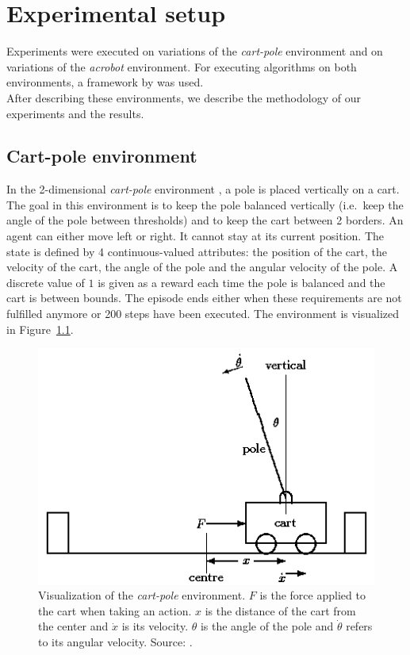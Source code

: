\chapter{Experimental setup}
Experiments were executed on variations of the \textit{cart-pole} environment and on variations of the \textit{acrobot} environment.
For executing algorithms on both environments, a framework by \cite{Brockman2016OpenAIGym} was used.\\
After describing these environments, we describe the methodology of our experiments and the results.\\

\section{Cart-pole environment} %
\label{sub:cartpole_environment}
In the 2-dimensional \textit{cart-pole} environment \parencite{journals/tsmc/BartoSA83}, a pole is placed vertically on a cart.
The goal in this environment is to keep the pole balanced vertically (i.e.\ keep the angle of the pole between thresholds) and to keep the cart between 2 borders.
An agent can either move left or right. It cannot stay at its current position.
The state is defined by 4 continuous-valued attributes: the position of the cart, the velocity of the cart, the angle of the pole and the angular velocity of the pole.
A discrete value of $1$ is given as a reward each time the pole is balanced and the cart is between bounds.
The episode ends either when these requirements are not fulfilled anymore or 200 steps have been executed.
The environment is visualized in Figure~\ref{fig:cartpole}.
\begin{figure}[htb]
    \centering
    \includegraphics[width=.6\linewidth]{images/cartpole.png}
    \caption[Visualization of the \emph{cart-pole} environment]{Visualization of the \emph{cart-pole} environment. $F$ is the force applied to the cart when taking an action. $x$ is the distance of the cart from the center and $\dot{x}$ is its velocity. $\theta$ is the angle of the pole and $\dot{\theta}$ refers to its angular velocity. Source: \cite{grant1990modelling}.}
    \label{fig:cartpole}
\end{figure}

